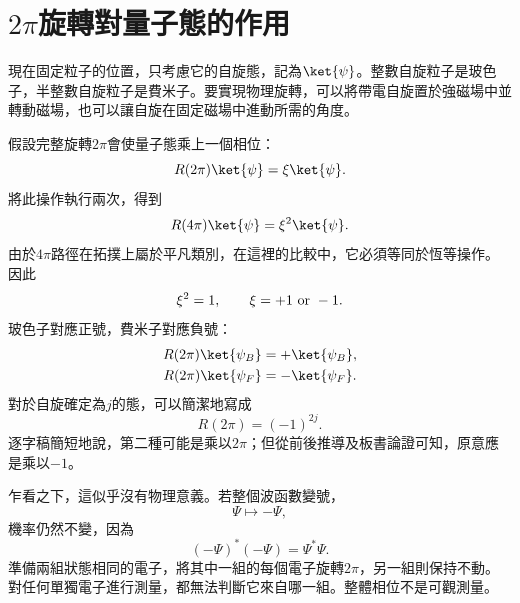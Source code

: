 
\section{\texorpdfstring{\(2\pi\)}{2 pi}旋轉對量子態的作用}

現在固定粒子的位置，只考慮它的自旋態，記為\(\ket{\psi}\)。整數自旋粒子是玻色子，半整數自旋粒子是費米子。要實現物理旋轉，可以將帶電自旋置於強磁場中並轉動磁場，也可以讓自旋在固定磁場中進動所需的角度。

\begin{classroomqa}
\end{classroomqa}

假設完整旋轉\(2\pi\)會使量子態乘上一個相位：
\begin{equation}
R(2\pi)\ket{\psi}=\xi\ket{\psi}.
\end{equation}
將此操作執行兩次，得到
\begin{equation}
R(4\pi)\ket{\psi}=\xi^2\ket{\psi}.
\end{equation}
由於\(4\pi\)路徑在拓撲上屬於平凡類別，在這裡的比較中，它必須等同於恆等操作。因此
\begin{equation}
\xi^2=1,
\qquad
\xi=+1\ \hbox{or}\ -1.
\end{equation}
玻色子對應正號，費米子對應負號：
\begin{align}
R(2\pi)\ket{\psi_B}&=+\ket{\psi_B},\\
R(2\pi)\ket{\psi_F}&=-\ket{\psi_F}.
\end{align}
對於自旋確定為\(j\)的態，可以簡潔地寫成
\begin{equation}
R(2\pi)=(-1)^{2j}.
\end{equation}
逐字稿簡短地說，第二種可能是乘以\(2\pi\)；但從前後推導及板書論證可知，原意應是乘以\(-1\)。

乍看之下，這似乎沒有物理意義。若整個波函數變號，
\begin{equation}
\Psi\longmapsto-\Psi,
\end{equation}
機率仍然不變，因為
\begin{equation}
(-\Psi)^*(-\Psi)=\Psi^*\Psi.
\end{equation}
準備兩組狀態相同的電子，將其中一組的每個電子旋轉\(2\pi\)，另一組則保持不動。對任何單獨電子進行測量，都無法判斷它來自哪一組。整體相位不是可觀測量。

